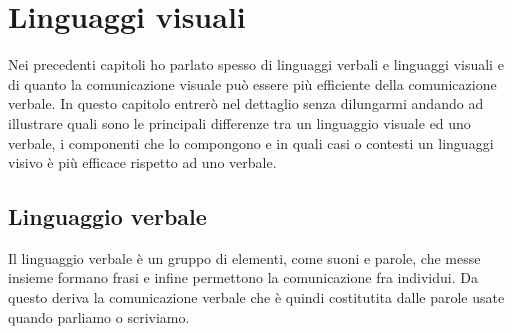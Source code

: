 \chapter{Linguaggi visuali}

    Nei precedenti capitoli ho parlato spesso di linguaggi verbali e linguaggi visuali e di quanto la comunicazione visuale può essere più efficiente della comunicazione verbale. In questo capitolo entrerò nel dettaglio senza dilungarmi andando ad illustrare quali sono le principali differenze tra un linguaggio visuale ed uno verbale, i componenti che lo compongono e in quali casi o contesti un linguaggi visivo è più efficace rispetto ad uno verbale.

    \section{Linguaggio verbale}
    Il linguaggio verbale è un gruppo di elementi, come suoni e parole, che messe insieme formano frasi e infine permettono la comunicazione fra individui. Da questo deriva la comunicazione verbale che è quindi costitutita dalle parole usate quando parliamo o scriviamo.

